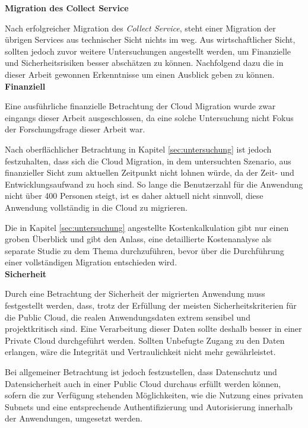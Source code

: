 \textbf{Migration des Collect Service}

Nach erfolgreicher Migration des \textit{Collect Service}, steht einer Migration der übrigen Services aus technischer Sicht nichts im weg. Aus wirtschaftlicher Sicht, sollten jedoch zuvor weitere Untersuchungen angestellt werden, um Finanzielle und Sicherheitsrisiken besser abschätzen zu können. Nachfolgend dazu die in dieser Arbeit gewonnen Erkenntnisse um einen Ausblick geben zu können. \\

\textbf{Finanziell}

Eine ausführliche finanzielle Betrachtung der Cloud Migration wurde zwar eingangs dieser Arbeit ausgeschlossen, da eine solche Untersuchung nicht Fokus der Forschungsfrage dieser Arbeit war.

Nach oberflächlicher Betrachtung in Kapitel \ref{sec:untersuchung} ist jedoch festzuhalten, dass sich die Cloud Migration, in dem untersuchten Szenario, aus finanzieller Sicht zum aktuellen Zeitpunkt nicht lohnen würde, da der Zeit- und Entwicklungsaufwand zu hoch sind. So lange die Benutzerzahl für die Anwendung nicht über 400 Personen steigt, ist es daher aktuell nicht sinnvoll, diese Anwendung vollständig in die Cloud zu migrieren.

Die in Kapitel \ref{sec:untersuchung} angestellte Kostenkalkulation gibt nur einen groben Überblick und gibt den Anlass, eine detaillierte Kostenanalyse als separate Studie zu dem Thema durchzuführen, bevor über die Durchführung einer vollständigen Migration entschieden wird. \\

\textbf{Sicherheit}

Durch eine Betrachtung der Sicherheit der migrierten Anwendung muss festgestellt werden, dass, trotz der Erfüllung der meisten Sicherheitskriterien für die Public Cloud, die realen Anwendungsdaten extrem sensibel und projektkritisch sind. Eine Verarbeitung dieser Daten sollte deshalb besser in einer Private Cloud durchgeführt werden. Sollten Unbefugte Zugang zu den Daten erlangen, wäre die Integrität und Vertraulichkeit nicht mehr gewährleistet.

Bei allgemeiner Betrachtung ist jedoch festzustellen, dass Datenschutz und Datensicherheit auch in einer Public Cloud durchaus erfüllt werden können, sofern die zur Verfügung stehenden Möglichkeiten, wie die Nutzung eines privaten Subnets und eine entsprechende Authentifizierung und Autorisierung innerhalb der Anwendungen, umgesetzt werden. \pagebreak

